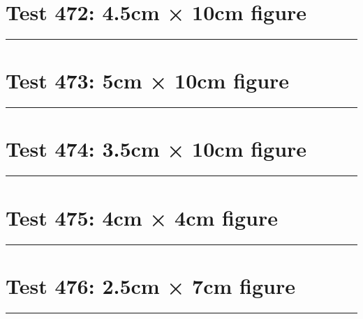 \documentclass[a4paper,11pt]{article}
\begin{document}
\section*{Test 472: 4.5cm × 10cm figure}
\begin{swarmwrap}%
  \begin{minipage}[t]{4cm}
    \centering
    \rule{\linewidth}{10cm}
  \end{minipage}%
\end{swarmwrap}%
\swarmwrapnext
\lipsum[34]
\lipsum[35]
\lipsum[36]
\lipsum[37]
\lipsum[38]
\section*{Test 473: 5cm × 10cm figure}
\begin{swarmwrap}%
  \begin{minipage}[t]{5cm}
    \centering
    \rule{\linewidth}{10cm}
  \end{minipage}%
\end{swarmwrap}%
\swarmwrapnext
\lipsum[35]
\lipsum[36]
\lipsum[37]
\lipsum[38]
\section*{Test 474: 3.5cm × 10cm figure}
\begin{swarmwrap}%
  \begin{minipage}[t]{3cm}
    \centering
    \rule{\linewidth}{10cm}
  \end{minipage}%
\end{swarmwrap}%
\swarmwrapnext
\lipsum[33]
\lipsum[34]
\lipsum[35]
\section*{Test 475: 4cm × 4cm figure}
\begin{swarmwrap}%
  \begin{minipage}[t]{4cm}
    \centering
    \rule{\linewidth}{4cm}
  \end{minipage}%
\end{swarmwrap}%
\swarmwrapnext
\lipsum[44]
\lipsum[45]
\lipsum[46]
\lipsum[47]
\lipsum[48]
\section*{Test 476: 2.5cm × 7cm figure}
\begin{swarmwrap}%
  \begin{minipage}[t]{2cm}
    \centering
    \rule{\linewidth}{7cm}
  \end{minipage}%
\end{swarmwrap}%
\swarmwrapnext
\lipsum[90]
\lipsum[91]
\lipsum[92]
\lipsum[93]
\end{document}
